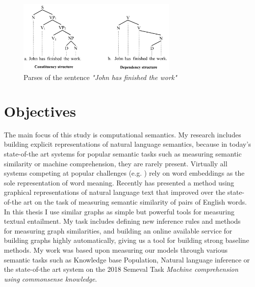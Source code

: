 \begin{figure}[h!]
	\centering
	\includegraphics[width=0.7\textwidth]{figures/Johnhasfinishedthework}
	\caption{Parses of the sentence \textit{"John has finished the work"} \cite{parsers}}
	\label{fig:johnfinished}
\end{figure}
\section{Objectives}
The main focus of this study is computational semantics. My research includes building explicit representations of natural language semantics, because in today's state-of-the art systems for popular semantic tasks such as measuring semantic similarity or machine comprehension, they are rarely present. Virtually all systems
competing at popular challenges (e.g. \cite{Cer:2017,Collados:2017}) rely on word embeddings as the sole representation of word meaning. Recently \cite{Recski:2016c} has presented a method using graphical representations of natural language text that improved over the state-of-the art on the task of
measuring semantic similarity of pairs of English words. In this thesis
I use similar graphs as simple but powerful tools for measuring textual
entailment. My task includes defining new inference rules and methods for measuring graph similarities, and building an online available service for building graphs highly automatically, giving us a tool for building strong baseline methods. My work was based upon measuring our models through various semantic tasks such as Knowledge base Population, Natural language inference or the state-of-the art system on the 2018 Semeval Task \textit{Machine comprehension using commonsense knowledge}.

